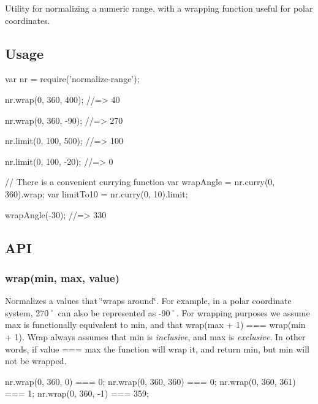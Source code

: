 Utility for normalizing a numeric range, with a wrapping function useful for polar coordinates.

\href{https://travis-ci.org/jamestalmage/normalize-range}{\tt } \href{https://coveralls.io/github/jamestalmage/normalize-range?branch=master}{\tt } \href{https://codeclimate.com/github/jamestalmage/normalize-range}{\tt } \href{https://david-dm.org/jamestalmage/normalize-range}{\tt } \href{https://david-dm.org/jamestalmage/normalize-range#info=devDependencies}{\tt }

\href{https://nodei.co/npm/normalize-range/}{\tt }

\subsection*{Usage}


\begin{DoxyCode}
var nr = require('normalize-range');

nr.wrap(0, 360, 400);
//=> 40

nr.wrap(0, 360, -90);
//=> 270

nr.limit(0, 100, 500);
//=> 100

nr.limit(0, 100, -20);
//=> 0

// There is a convenient currying function
var wrapAngle = nr.curry(0, 360).wrap;
var limitTo10 = nr.curry(0, 10).limit;

wrapAngle(-30);
//=> 330
\end{DoxyCode}
 \subsection*{A\+PI}

\subsubsection*{wrap(min, max, value)}

Normalizes a values that \char`\"{}wraps around\char`\"{}. For example, in a polar coordinate system, 270˚ can also be represented as -\/90˚. For wrapping purposes we assume {\ttfamily max} is functionally equivalent to {\ttfamily min}, and that {\ttfamily wrap(max + 1) === wrap(min + 1)}. Wrap always assumes that {\ttfamily min} is {\itshape inclusive}, and {\ttfamily max} is {\itshape exclusive}. In other words, if {\ttfamily value === max} the function will wrap it, and return {\ttfamily min}, but {\ttfamily min} will not be wrapped.


\begin{DoxyCode}
nr.wrap(0, 360, 0) === 0;
nr.wrap(0, 360, 360) === 0;
nr.wrap(0, 360, 361) === 1;
nr.wrap(0, 360, -1) === 359;
\end{DoxyCode}


